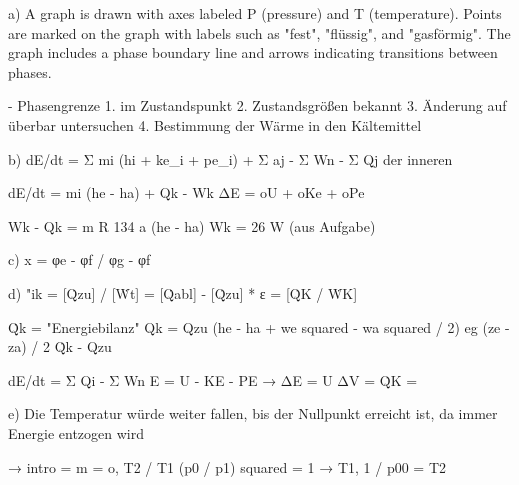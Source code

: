 a) A graph is drawn with axes labeled P (pressure) and T (temperature). Points are marked on the graph with labels such as "fest", "flüssig", and "gasförmig". The graph includes a phase boundary line and arrows indicating transitions between phases. 

- Phasengrenze
  1. im Zustandspunkt
  2. Zustandsgrößen bekannt
  3. Änderung auf überbar untersuchen
  4. Bestimmung der Wärme in den Kältemittel

b) dE/dt = Σ mi (hi + ke_i + pe_i) + Σ aj - Σ Wn - Σ Qj der inneren

dE/dt = mi (he - ha) + Qk - Wk
ΔE = oU + oKe + oPe

Wk - Qk = m R 134 a (he - ha)
Wk = 26 W (aus Aufgabe)

c) x = φe - φf / φg - φf

d) "ik = [Q̇zu] / [Ẇt] = [Q̇abl] - [Q̇zu] * ε = [Q̇K / ẆK]

Q̇k = "Energiebilanz"
Qk = Qzu (he - ha + we squared - wa squared / 2) eg (ze - za) / 2 Q̇k - Qzu

dE/dt = Σ Qi - Σ Wn
E = U - KE - PE → ΔE = U
ΔV = Q̇K =

e) Die Temperatur würde weiter fallen, bis der Nullpunkt erreicht ist, da immer Energie entzogen wird

→ intro = m = o, T2 / T1 (p0 / p1) squared = 1 → T1, 1 / p00 = T2
